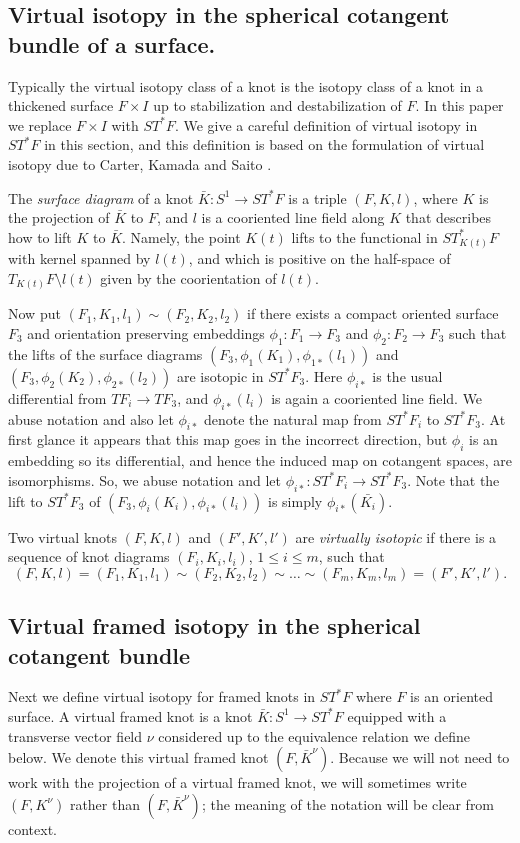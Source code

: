 \subsection{Virtual isotopy in the spherical cotangent bundle of a surface.}  Typically the virtual isotopy class of a knot is the isotopy class of a knot in a thickened surface $F\times I$ up to stabilization and destabilization of $F$.  In this paper we replace $F\times I$ with $ST^*F$.  We give a careful definition of virtual isotopy in $ST^*F$ in this section, and this definition is based on the formulation of virtual isotopy due to Carter, Kamada and Saito \cite{CKS}.

The {\it surface diagram} of a knot $\bar{K}:S^1\rightarrow ST^*F$ is a triple $(F,K,l)$, where $K$ is the projection of $\bar{K}$ to $F$, and $l$ is a cooriented line field along $K$ that describes how to lift $K$ to $\bar{K}$.  Namely, the point $K(t)$ lifts to the functional in $ST_{K(t)}^*F$ with kernel spanned by $l(t)$, and which is positive on the half-space of $T_{K(t)}F\setminus l(t)$ given by the coorientation of $l(t)$.

Now put $(F_1, K_1,l_1) \sim (F_2,K_2,l_2)$ if there exists a compact oriented surface $F_3$ and orientation preserving embeddings $\phi_1: F_1\rightarrow F_3$ and $\phi_2: F_2\rightarrow F_3$ such that the lifts of the surface diagrams $(F_3, \phi_1(K_1), \phi_{1*}(l_1))$ and $(F_3, \phi_2(K_2), \phi_{2*}(l_2))$ are isotopic in $ST^*F_3$.  Here $\phi_{i*}$ is the usual differential from $TF_i\rightarrow TF_3$, and $\phi_{i*}(l_i)$ is again a cooriented line field.  We abuse notation and also let $\phi_{i*}$ denote the natural map from $ST^*F_i$ to $ST^*F_3$.  At first glance it appears that this map goes in the incorrect direction, but $\phi_i$ is an embedding so its differential, and hence the induced map on cotangent spaces, are isomorphisms.  So, we abuse notation and let $\phi_{i*}:ST^*F_i\rightarrow ST^*F_3$. Note that the lift to $ST^*F_3$ of $(F_3,\phi_i(K_i),\phi_{i*}(l_i))$ is simply $\phi_{i*}(\bar{K_i})$.



Two virtual knots $(F,K,l)$ and $(F',K',l')$ are {\it virtually isotopic} if there  is a sequence of knot diagrams $(F_i,K_i,l_i)$, $1\leq i \leq m$, such that 
$$(F,K,l)=(F_1,K_1,l_1)\sim (F_2,K_2,l_2) \sim \dots \sim (F_m,K_m,l_m)=(F',K',l').$$


\subsection{Virtual framed isotopy in the spherical cotangent bundle} \label{framedisotopydef}
Next we define virtual isotopy for framed knots in $ST^*F$ where $F$ is an oriented surface.  A virtual framed knot is a knot $\bar{K}:S^1 \rightarrow ST^*F$ equipped with a transverse vector field $\nu$ considered up to the equivalence relation we define below.  We denote this virtual framed knot $(F,\bar{K}^\nu)$.  Because we will not need to work with the projection of a virtual framed knot, we will sometimes write $(F,K^\nu)$ rather than $(F,\bar{K}^\nu)$; the meaning of the notation will be clear from context.



